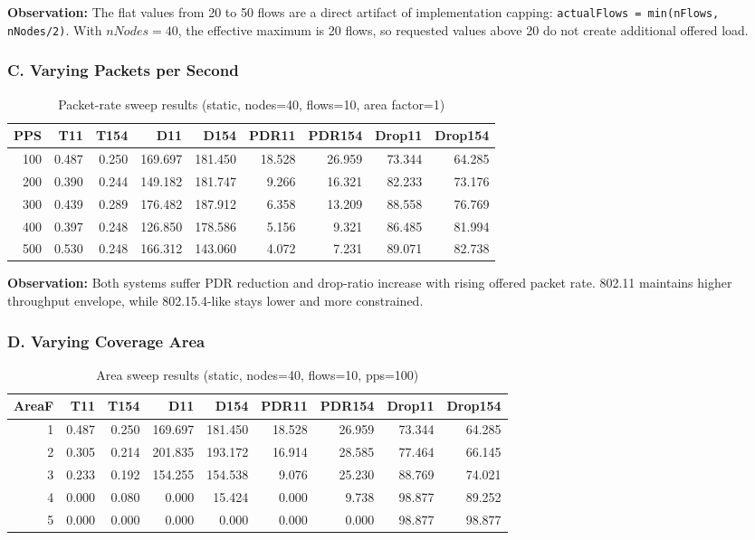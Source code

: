 \documentclass[12pt,a4paper]{article}
\begin{document}
\textbf{Observation:}
The flat values from 20 to 50 flows are a direct artifact of implementation capping: \texttt{actualFlows = min(nFlows, nNodes/2)}. With $nNodes=40$, the effective maximum is 20 flows, so requested values above 20 do not create additional offered load.

\subsubsection*{C. Varying Packets per Second}
\begin{table}[H]
\centering
\scriptsize
\caption{Packet-rate sweep results (static, nodes=40, flows=10, area factor=1)}
\begin{tabular}{rrrrrrrrr}
\toprule
PPS & T11 & T154 & D11 & D154 & PDR11 & PDR154 & Drop11 & Drop154 \\
\midrule
100 & 0.487 & 0.250 & 169.697 & 181.450 & 18.528 & 26.959 & 73.344 & 64.285 \\
200 & 0.390 & 0.244 & 149.182 & 181.747 & 9.266  & 16.321 & 82.233 & 73.176 \\
300 & 0.439 & 0.289 & 176.482 & 187.912 & 6.358  & 13.209 & 88.558 & 76.769 \\
400 & 0.397 & 0.248 & 126.850 & 178.586 & 5.156  & 9.321  & 86.485 & 81.994 \\
500 & 0.530 & 0.248 & 166.312 & 143.060 & 4.072  & 7.231  & 89.071 & 82.738 \\
\bottomrule
\end{tabular}
\end{table}

\textbf{Observation:}
Both systems suffer PDR reduction and drop-ratio increase with rising offered packet rate. 802.11 maintains higher throughput envelope, while 802.15.4-like stays lower and more constrained.

\subsubsection*{D. Varying Coverage Area}
\begin{table}[H]
\centering
\scriptsize
\caption{Area sweep results (static, nodes=40, flows=10, pps=100)}
\begin{tabular}{rrrrrrrrr}
\toprule
AreaF & T11 & T154 & D11 & D154 & PDR11 & PDR154 & Drop11 & Drop154 \\
\midrule
1 & 0.487 & 0.250 & 169.697 & 181.450 & 18.528 & 26.959 & 73.344 & 64.285 \\
2 & 0.305 & 0.214 & 201.835 & 193.172 & 16.914 & 28.585 & 77.464 & 66.145 \\
3 & 0.233 & 0.192 & 154.255 & 154.538 & 9.076  & 25.230 & 88.769 & 74.021 \\
4 & 0.000 & 0.080 & 0.000   & 15.424  & 0.000  & 9.738  & 98.877 & 89.252 \\
5 & 0.000 & 0.000 & 0.000   & 0.000   & 0.000  & 0.000  & 98.877 & 98.877 \\
\bottomrule
\end{tabular}
\end{table}
\end{document}
